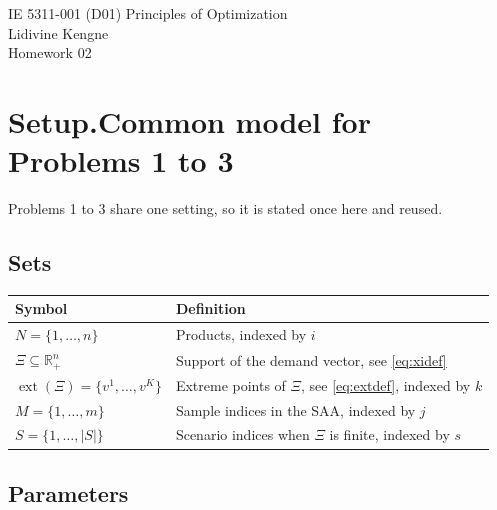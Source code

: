\documentclass[11pt]{article}
\DeclareMathOperator{\ext}{ext}
\theoremstyle{definition}
\begin{document}
\begin{center}
  {\large IE 5311-001 (D01) Principles of Optimization}\\[4pt]
  Lidivine Kengne\\[2pt]
  Homework 02
\end{center}
\vspace{0.6em}

\section*{Setup.\quad Common model for Problems 1 to 3}

Problems 1 to 3 share one setting, so it is stated once here and reused.

\subsection*{Sets}

\begin{center}
\begin{tabular}{@{}ll@{}}
\toprule
Symbol & Definition \\
\midrule
$N = \{1,\dots,n\}$ & Products, indexed by $i$ \\
$\Xi \subseteq \mathbb{R}^n_+$ & Support of the demand vector, see
   \eqref{eq:xidef} \\
$\ext(\Xi) = \{v^1,\dots,v^K\}$ & Extreme points of $\Xi$, see
   \eqref{eq:extdef}, indexed by $k$ \\
$M = \{1,\dots,m\}$ & Sample indices in the SAA, indexed by $j$ \\
$S = \{1,\dots,|S|\}$ & Scenario indices when $\Xi$ is finite, indexed by $s$ \\
\bottomrule
\end{tabular}
\end{center}

\subsection*{Parameters}
\end{document}
